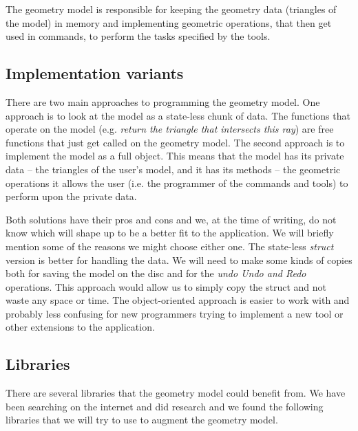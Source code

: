 The geometry model is responsible for keeping the geometry data (triangles of the model) in memory and implementing geometric operations, that then get used in commands, to perform the tasks specified by the tools.

\subsection{Implementation variants}

There are two main approaches to programming the geometry model. One approach is to look at the model as a state-less chunk of data. The functions that operate on the model (e.g. \textit{return the triangle that intersects this ray}) are free functions that just get called on the geometry model. The second approach is to implement the model as a full object. This means that the model has its private data -- the triangles of the user's model, and it has its methods -- the geometric operations it allows the user (i.e. the programmer of the commands and tools) to perform upon the private data.

Both solutions have their pros and cons and we, at the time of writing, do not know which will shape up to be a better fit to the application. We will briefly mention some of the reasons we might choose either one. The state-less \textit{struct} version is better for handling the data. We will need to make some kinds of copies both for saving the model on the disc and for the \textit{undo Undo and Redo} operations. This approach would allow us to simply copy the struct and not waste any space or time. The object-oriented approach is easier to work with and probably less confusing for new programmers trying to implement a new tool or other extensions to the application.

\subsection{Libraries}

There are several libraries that the geometry model could benefit from. We have been searching on the internet and did research and we found the following libraries that we will try to use to augment the geometry model.

